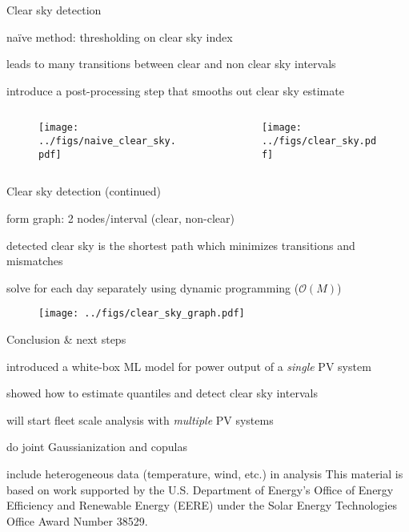 \documentclass[aspectratio=169,11pt]{beamer}
\begin{document}
\begin{frame}{Clear sky detection}

\BIT
\item na\"{i}ve method: thresholding on clear sky index
\item leads to many transitions between clear and 
non clear sky intervals
\item introduce a post-processing step that smooths 
out clear sky estimate  
\EIT

\begin{columns}
	\begin{column}{0.5\textwidth}
		\begin{figure}
			\centering
			\texttt{[image: ../figs/naive\_clear\_sky.pdf]}
		\end{figure}
	\end{column}
	\begin{column}{0.5\textwidth}
		\begin{figure}
			\centering
			\texttt{[image: ../figs/clear\_sky.pdf]}
		\end{figure}
	\end{column}
\end{columns}


\end{frame}

\begin{frame}{Clear sky detection (continued)}
\BIT 
\item form graph: 2 nodes/interval (clear, non-clear)
\item detected clear sky is the shortest 
path which minimizes transitions and mismatches
\item solve for each day separately using dynamic programming ($\mathcal{O}(M)$)
\EIT

\begin{figure}
\centerline{\texttt{[image: ../figs/clear\_sky\_graph.pdf]}}
\end{figure}
\end{frame}




\begin{frame}{Conclusion \& next steps}
	\BIT
	\item introduced a white-box ML model for power output of a \emph{single} PV system
	\item showed how to estimate quantiles and detect clear sky intervals 
	\vspace{5mm}
	\item will start fleet scale analysis with \emph{multiple} PV systems
	\item do joint Gaussianization and copulas
	\item include heterogeneous data (temperature, wind, etc.) in analysis
	\EIT
	\vspace{5mm}
	{\footnotesize This material is based on work supported by the U.S. Department of Energy's Office of
	Energy Efficiency and Renewable Energy (EERE) under the Solar Energy Technologies Office
	Award Number 38529.}
\end{frame}
	
\end{document}
